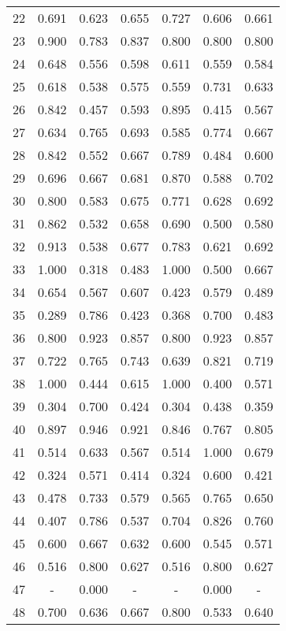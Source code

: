 \begin{table}[H]
\begin{tabular}{lcccccc}
    22 & 0.691 & 0.623 & 0.655 & 0.727 & 0.606 & 0.661 \\
    23 & 0.900 & 0.783 & 0.837 & 0.800 & 0.800 & 0.800 \\
    24 & 0.648 & 0.556 & 0.598 & 0.611 & 0.559 & 0.584 \\
    25 & 0.618 & 0.538 & 0.575 & 0.559 & 0.731 & 0.633 \\
    26 & 0.842 & 0.457 & 0.593 & 0.895 & 0.415 & 0.567 \\
    27 & 0.634 & 0.765 & 0.693 & 0.585 & 0.774 & 0.667 \\
    28 & 0.842 & 0.552 & 0.667 & 0.789 & 0.484 & 0.600 \\
    29 & 0.696 & 0.667 & 0.681 & 0.870 & 0.588 & 0.702 \\
    30 & 0.800 & 0.583 & 0.675 & 0.771 & 0.628 & 0.692 \\
    31 & 0.862 & 0.532 & 0.658 & 0.690 & 0.500 & 0.580 \\
    32 & 0.913 & 0.538 & 0.677 & 0.783 & 0.621 & 0.692 \\
    33 & 1.000 & 0.318 & 0.483 & 1.000 & 0.500 & 0.667 \\
    34 & 0.654 & 0.567 & 0.607 & 0.423 & 0.579 & 0.489 \\
    35 & 0.289 & 0.786 & 0.423 & 0.368 & 0.700 & 0.483 \\
    36 & 0.800 & 0.923 & 0.857 & 0.800 & 0.923 & 0.857 \\
    37 & 0.722 & 0.765 & 0.743 & 0.639 & 0.821 & 0.719 \\
    38 & 1.000 & 0.444 & 0.615 & 1.000 & 0.400 & 0.571 \\
    39 & 0.304 & 0.700 & 0.424 & 0.304 & 0.438 & 0.359 \\
    40 & 0.897 & 0.946 & 0.921 & 0.846 & 0.767 & 0.805 \\
    41 & 0.514 & 0.633 & 0.567 & 0.514 & 1.000 & 0.679 \\
    42 & 0.324 & 0.571 & 0.414 & 0.324 & 0.600 & 0.421 \\
    43 & 0.478 & 0.733 & 0.579 & 0.565 & 0.765 & 0.650 \\
    44 & 0.407 & 0.786 & 0.537 & 0.704 & 0.826 & 0.760 \\
    45 & 0.600 & 0.667 & 0.632 & 0.600 & 0.545 & 0.571 \\
    46 & 0.516 & 0.800 & 0.627 & 0.516 & 0.800 & 0.627 \\
    47 & - & 0.000 & - & - & 0.000 & - \\
    48 & 0.700 & 0.636 & 0.667 & 0.800 & 0.533 & 0.640 \\

\end{tabular}
\end{table}
